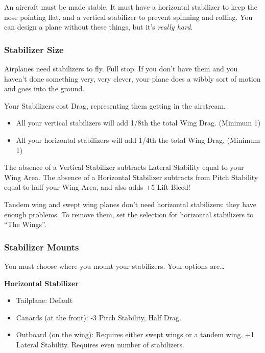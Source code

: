 \documentclass{article}
\begin{document}
An aircraft must be made stable. It must have a horizontal stabilizer to
keep the nose pointing flat, and a vertical stabilizer to prevent
spinning and rolling. You can design a plane without these things, but
it's \emph{really hard}.

\subsubsection{Stabilizer Size}
\label{_Stabilizer Size}

Airplanes need stabilizers to fly. Full stop. If you don't have them and
you haven't done something very, very clever, your plane does a wibbly
sort of motion and goes into the ground.

Your Stabilizers cost Drag, representing them getting in the airstream.

\begin{itemize}
    \item          All your vertical stabilizers will add 1/8th the total Wing
          Drag. (Minimum 1)
    \item          All your horizontal stabilizers will add 1/4th the total Wing
          Drag. (Minimum 1)
\end{itemize}

The absence of a Vertical Stabilizer subtracts Lateral Stability equal
to your Wing Area. The absence of a Horizontal Stabilizer subtracts from
Pitch Stability equal to half your Wing Area, and also adds +5 Lift
Bleed!

Tandem wing and swept wing planes don't need horizontal stabilizers:
they have enough problems. To remove them, set the selection for
horizontal stabilizers to ``The Wings''.

\subsubsection{Stabilizer Mounts}
\label{_Stabilizer Mounts}

You must choose where you mount your stabilizers. Your options
are\ldots{}

\textbf{Horizontal Stabilizer}

\begin{itemize}
    \item          Tailplane: Default
    \item          Canards (at the front): -3 Pitch Stability, Half Drag.
    \item          Outboard (on the wing): Requires either swept wings or a tandem
          wing. +1 Lateral Stability. Requires even number of stabilizers.
\end{itemize}
\end{document}
